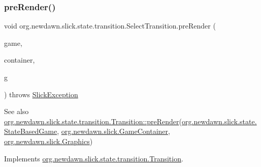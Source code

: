 \subsubsection{\texorpdfstring{pre\+Render()}{preRender()}}
{\footnotesize\ttfamily void org.\+newdawn.\+slick.\+state.\+transition.\+Select\+Transition.\+pre\+Render (\begin{DoxyParamCaption}\item[{\mbox{\hyperlink{classorg_1_1newdawn_1_1slick_1_1state_1_1_state_based_game}{State\+Based\+Game}}}]{game,  }\item[{\mbox{\hyperlink{classorg_1_1newdawn_1_1slick_1_1_game_container}{Game\+Container}}}]{container,  }\item[{\mbox{\hyperlink{classorg_1_1newdawn_1_1slick_1_1_graphics}{Graphics}}}]{g }\end{DoxyParamCaption}) throws \mbox{\hyperlink{classorg_1_1newdawn_1_1slick_1_1_slick_exception}{Slick\+Exception}}\hspace{0.3cm}{\ttfamily [inline]}}

\begin{DoxySeeAlso}{See also}
\mbox{\hyperlink{interfaceorg_1_1newdawn_1_1slick_1_1state_1_1transition_1_1_transition_ab8b0668c059830d938575d1a0b08bd93}{org.\+newdawn.\+slick.\+state.\+transition.\+Transition\+::pre\+Render}}(\mbox{\hyperlink{classorg_1_1newdawn_1_1slick_1_1state_1_1_state_based_game}{org.\+newdawn.\+slick.\+state.\+State\+Based\+Game}}, \mbox{\hyperlink{classorg_1_1newdawn_1_1slick_1_1_game_container}{org.\+newdawn.\+slick.\+Game\+Container}}, \mbox{\hyperlink{classorg_1_1newdawn_1_1slick_1_1_graphics}{org.\+newdawn.\+slick.\+Graphics}}) 
\end{DoxySeeAlso}


Implements \mbox{\hyperlink{interfaceorg_1_1newdawn_1_1slick_1_1state_1_1transition_1_1_transition_ab8b0668c059830d938575d1a0b08bd93}{org.\+newdawn.\+slick.\+state.\+transition.\+Transition}}.


